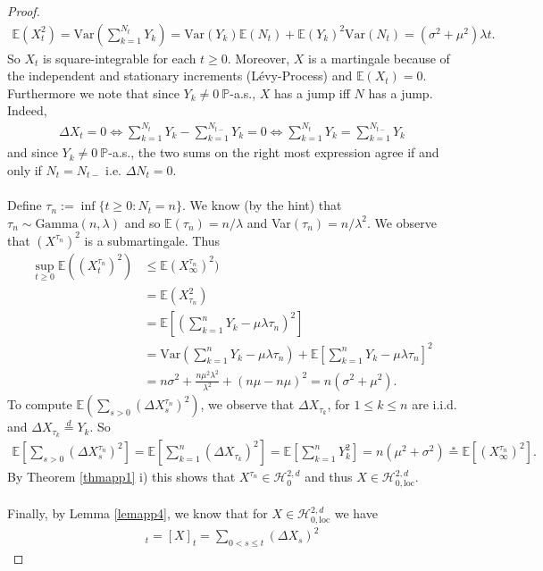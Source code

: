 \documentclass[12pt,a4paper, twoside]{article}
\theoremstyle{definition}
\newcommand{\EE}{\mathbb{E}} %
\newcommand{\PP}{\mathbb{P}} %
\begin{document}
\begin{proof}
\begin{align*}
\EE(X_t^2) = \text{Var} \left( \sum_{k=1}^{N_t} Y_k \right) = \text{Var}(Y_k) \EE(N_t) + \EE(Y_k)^2 \text{Var}(N_t)= ( \sigma^2 + \mu^2) \lambda t.
\end{align*}
So $X_t$ is square-integrable for each $t \geq 0$. Moreover,  $X$ is a martingale because of the independent and stationary increments (Lévy-Process) and $\EE(X_t)=0$. Furthermore we note that since $Y_k \neq 0 \ \PP$-a.s., $X$ has a jump iff $N$ has a jump. Indeed,
\begin{align*}
\Delta X_t = 0 \iff \sum_{k=1}^{N_t} Y_k - \sum_{k=1}^{N_{t-}} Y_k =0 \iff \sum_{k=1}^{N_t} Y_k = \sum_{k=1}^{N_{t-}} Y_k
\end{align*}
and since $Y_k \neq 0 \ \PP$-a.s., the two sums on the right most expression agree if and only if $N_t=N_{t-}$ i.e. $\Delta N_t=0$. 
\\\\
Define $\tau_n := \inf \{ t \geq 0 : N_t = n \}.$ We know (by the hint) that $\tau_n \sim \text{Gamma}(n, \lambda)$ and so $\EE(\tau_n)=n/\lambda$ and Var$( \tau_n)= n/ \lambda^2$. We observe that $(X^{\tau_n})^2$ is a submartingale. Thus 
\begin{align*}
\sup_{t \geq 0 } \EE((X_t^{\tau_n})^2) &\leq \EE(X_\infty^{\tau_n})^2) \\
&= \EE ( X_{\tau_n}^2)  \\
&= \EE \left[ \left( \sum_{k=1}^n Y_k - \mu \lambda \tau_n \right)^2 \right] \\
&= \text{Var} \left( \sum_{k=1}^n Y_k - \mu \lambda \tau_n \right) + \EE \left[ \sum_{k=1}^n Y_k - \mu  \lambda \tau_n \right]^2  \\
&= n \sigma^2 + \frac{n \mu^2 \lambda^2}{\lambda^2} + (n \mu - n \mu)^2 = n ( \sigma^2 + \mu^2). \tag{*}
\end{align*}
\newpage
To compute $\EE( \sum_{s >0} ( \Delta X_s^{\tau_n})^2)$, we observe that $\Delta X_{\tau_k}$, for $1 \leq k \leq n$ are i.i.d. and $\Delta X_{\tau_k} \overset{d}= Y_k$. So  
\begin{align*}
\EE \left[ \sum_{s >0} ( \Delta X_s^{\tau_n})^2 \right] = \EE \left[ \sum_{k=1}^n ( \Delta X_{\tau_k})^2 \right] = \EE \left[ \sum_{k=1}^n Y_k^2 \right] = n( \mu^2 + \sigma^2) \overset{*}= \EE[( X_\infty^{\tau_n})^2].
\end{align*}
By Theorem \ref{thmapp1} i) this shows that $X^{\tau_n} \in \mathcal{H}_0^{2,d}$ and thus $X \in \mathcal{H}_{0, \text{loc}}^{2,d}$.
\\\\
Finally, by Lemma \ref{lemapp4}, we know that for $X \in \mathcal{H}_{0, \text{loc}}^{2,d}$ we have 
\begin{align*}
[X^d ]_t=[X]_t= \sum_{0 < s \leq t} ( \Delta X_s)^2
\end{align*}
\end{proof}
\end{document}
